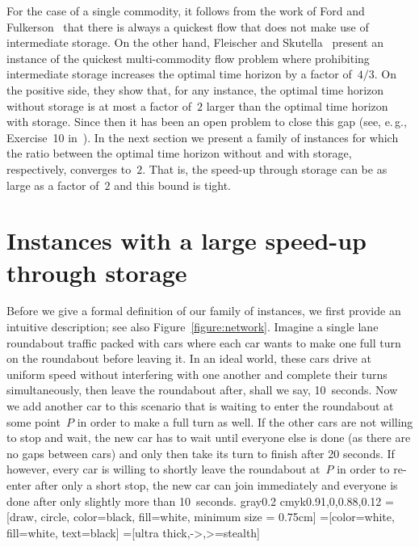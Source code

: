 \documentclass[number]{llncs}
\def\eg{{e.\,g.}}
\begin{document}
For the case of a single commodity, it follows from the work of Ford and Fulkerson~\cite{FordFulkerson58} that there is always a quickest flow that does not make use of intermediate storage. On the other hand, Fleischer and Skutella~\cite{FleischerSkutella02,FleischerSkutella07} present an instance of the quickest multi-commodity flow problem where prohibiting intermediate storage increases the optimal time horizon by a factor of~$4/3$. On the positive side, they show that, for any instance, the optimal time horizon without storage is at most a factor of~$2$ larger than the optimal time horizon with storage. Since then it has been an open problem to close this gap (see, \eg, Exercise~10 in~\cite{Skutella09}). In the next section we present a family of instances for which the ratio between the optimal time horizon without and with storage, respectively, converges to~$2$. That is, the speed-up through storage can be as large as a factor of~$2$ and this bound is tight.



\section{Instances with a large speed-up through storage}

Before we give a formal definition of our family of instances, we first provide an intuitive description; see also Figure~\ref{figure:network}. Imagine a single lane roundabout traffic packed with cars where each car wants to make one full turn on the roundabout before leaving it. In an ideal world, these cars drive at uniform speed without interfering with one another and complete their turns simultaneously, then leave the roundabout after, shall we say, 10~seconds. Now we add another car to this scenario that is waiting to enter the roundabout at some point~$P$ in order to make a full turn as well. If the other cars are not willing to stop and wait, the new car has to wait until everyone else is done (as there are no gaps between cars) and only then take its turn to finish after 20 seconds. If however, every car is willing to shortly leave the roundabout at~$P$ in order to re-enter after only a short stop, the new car can join immediately and everyone is done after only slightly more than 10~seconds.\definecolor{DarkGray}    {gray}{0.2}
\definecolor{ForestGreen} {cmyk}{0.91,0,0.88,0.12}
=[draw, circle, color=black, fill=white, minimum size = 0.75cm]
=[color=white, fill=white, text=black]
=[ultra thick,->,>=stealth]
\end{document}
